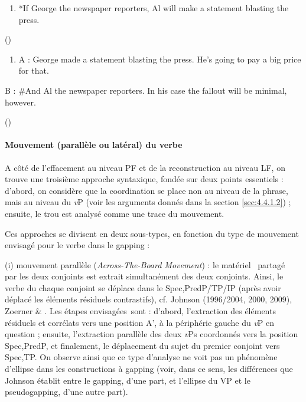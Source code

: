 \begin{enumerate}
\item \label{bkm:Ref289775695}*If George the newspaper reporters, Al will make a statement blasting the press. 


\end{enumerate}
{\raggedleft
(\citet[91]{Kehler2002})
}


\begin{enumerate}
\item \label{bkm:Ref289775778}A :   George made a statement blasting the press. He's going to pay a big price for that.  


\end{enumerate}
  B :  \#And Al the newspaper reporters. In his case the fallout will be minimal, however.

{\raggedleft
 (\citet[91]{Kehler2002})
}

\paragraph[Mouvement (parallèle ou latéral) du verbe]{Mouvement (parallèle ou latéral) du verbe}
\label{bkm:Ref289726933}A côté de l'effacement au niveau PF et de la reconstruction au niveau LF, on trouve une troisième approche syntaxique, fondée sur deux points essentiels : d'abord, on considère que la coordination se place non au niveau de la phrase, mais au niveau du \textit{v}P (voir les arguments donnés dans la section \ref{sec:4.4.1.2}) ; ensuite, le trou est analysé comme une trace du mouvement.

Ces approches se divisent en deux sous-types, en fonction du type de mouvement envisagé pour le verbe dans le gapping :

(i) mouvement parallèle (\textit{Across-The-Board Movement}) : le matériel {\guillemotleft}~partagé~{\guillemotright} par les deux conjoints est extrait simultanément des deux conjoints. Ainsi, le verbe du chaque conjoint se déplace dans le Spec,PredP/TP/IP (après avoir déplacé les éléments résiduels contrastifs), cf. Johnson (1996/2004, 2000, 2009), Zoerner \& \citet{Agbayani2000}. Les étapes envisagées~sont : d'abord, l'extraction des éléments résiduels et corrélats vers une position A', à la périphérie gauche du \textit{v}P en question ; ensuite, l'extraction parallèle des deux \textit{v}Ps coordonnés vers la position Spec,PredP, et finalement, le déplacement du sujet du premier conjoint vers Spec,TP. On observe ainsi que ce type d'analyse ne voit pas un phénomène d'ellipse dans les constructions à gapping (voir, dans ce sens, les différences que Johnson établit entre le gapping, d'une part, et l'ellipse du VP et le pseudogapping, d'une autre part).


